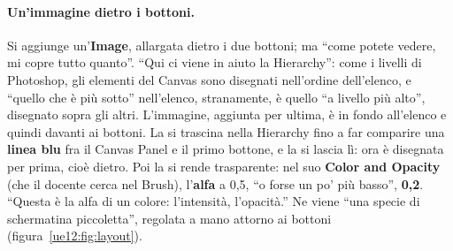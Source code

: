 \paragraph{Un'immagine dietro i bottoni.} Si aggiunge un'\textbf{Image}, allargata dietro i
due bottoni; ma ``come potete vedere, mi copre tutto quanto''. ``Qui ci viene in aiuto la
Hierarchy'': come i livelli di Photoshop, gli elementi del Canvas sono disegnati
nell'ordine dell'elenco, e ``quello che è più sotto'' nell'elenco, stranamente, è quello
``a livello più alto'', disegnato sopra gli altri. L'immagine, aggiunta per ultima, è in
fondo all'elenco e quindi davanti ai bottoni. La si trascina nella Hierarchy fino a far
comparire una \textbf{linea blu} fra il Canvas Panel e il primo bottone, e la si lascia lì:
ora è disegnata per prima, cioè dietro. Poi la si rende trasparente: nel suo
\textbf{Color and Opacity} (che il docente cerca nel Brush), l'\textbf{alfa} a 0,5, ``o
forse un po' più basso'', \textbf{0,2}. ``Questa è la alfa di un colore: l'intensità,
l'opacità.'' Ne viene ``una specie di schermatina piccoletta'', regolata a mano attorno ai
bottoni (figura~\ref{ue12:fig:layout}).

